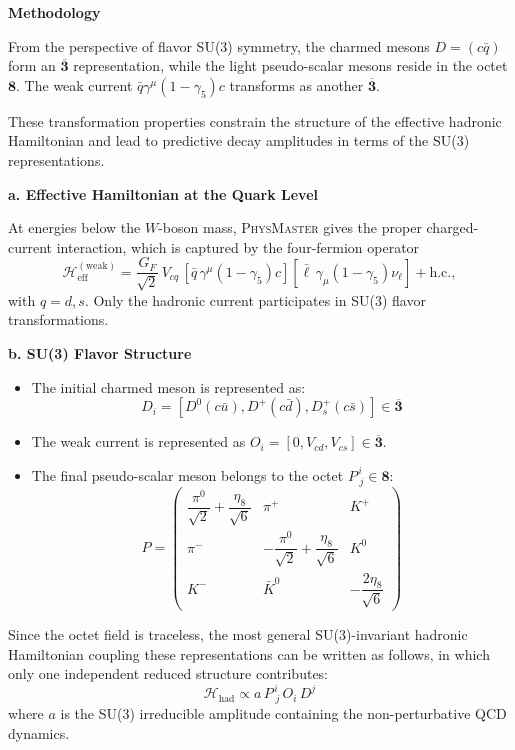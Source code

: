 \documentclass[11pt, a4paper, logo, copyright, nonumbering]{SAI}
\newcommand{\agent}{\textsc{PhysMaster}\xspace}
\begin{document}
\noindent \textbf{Methodology}

From the perspective of flavor SU(3) symmetry, the charmed mesons \(D=(c\bar q)\) form an \(\overline{\mathbf{3}}\) representation, while the light pseudo-scalar mesons reside in the octet \(\mathbf{8}\). The weak current \(\bar q \gamma^\mu (1-\gamma_5) c\) transforms as another \(\overline{\mathbf{3}}\). 

These transformation properties constrain the structure of the effective hadronic Hamiltonian and lead to predictive decay amplitudes in terms of the SU(3) representations.

\medskip
\noindent \textbf{a. Effective Hamiltonian at the Quark Level}

At energies below the \(W\)-boson mass, \agent gives the proper charged-current interaction, which is captured by the four-fermion operator
\[
\mathcal{H}_{\mathrm{eff}}^{\mathrm{(weak)}}
   = \frac{G_F}{\sqrt{2}}\, V_{cq}\,
     \left[ \bar q\, \gamma^\mu(1-\gamma_5) c \right]
     \left[ \bar\ell\, \gamma_\mu(1-\gamma_5) \nu_\ell \right]
     + \text{h.c.},
\]
with \(q=d,s\). Only the hadronic current participates in SU(3) flavor transformations.

\medskip
\noindent \textbf{b. SU(3) Flavor Structure}

\begin{itemize}
    \item The initial charmed meson is represented as: 
    \[D_i = [D^0(c\bar u), D^+(c\bar d), D_s^+(c\bar s)] \in \overline{\mathbf{3}}\]
    \item The weak current is represented as \(O_i =[0,V_{cd},V_{cs}] \in \overline{\mathbf{3}}\).
    \item The final pseudo-scalar meson belongs to the octet \(P^{\,i}_{\; j} \in \mathbf{8}\):
    \[
    P = \begin{pmatrix}
        \dfrac{\pi^0}{\sqrt2}+\dfrac{\eta_8}{\sqrt{6}} & \pi^+ & K^+ \\
        \pi^- & -\dfrac{\pi^0}{\sqrt2}+\dfrac{\eta_8}{\sqrt{6}} & K^0 \\
        K^- & \bar K^0 & -\dfrac{2\eta_8}{\sqrt{6}}
    \end{pmatrix}
    \]
\end{itemize}

Since the octet field is traceless, the most general SU(3)-invariant hadronic Hamiltonian coupling these representations can be written as follows, in which only one independent reduced structure contributes:
\[
\mathcal{H}_{\mathrm{had}}
  \propto  
   a\, P^{\,i}_{\; j}\, O_i\, D^j 
\]
where \(a\) is the SU(3) irreducible amplitude containing the non-perturbative QCD dynamics. 
\end{document}
